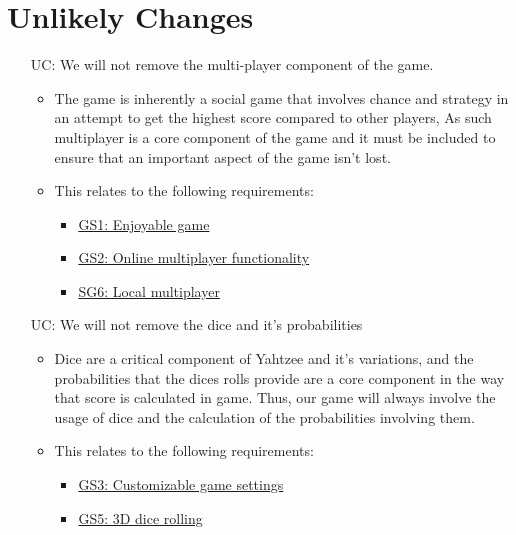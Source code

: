 \begin{itemize}
    


\end{itemize}

\newpage
\section{Unlikely Changes}    

\noindent \begin{itemize}

\item[UC\refstepcounter{ucnum}\theucnum \label{ULC_multiplayer}:] We will not remove the multi-player component of the game.

\begin{itemize}
	\item The game is inherently a social game that involves chance and strategy in an attempt to get the highest score compared to other players, As such multiplayer is a core component of the game and it must be included to ensure that an important aspect of the game isn't lost.
	\item This relates to the following requirements: 
	\begin{itemize}
		\item \hyperref[G_enjoyable]{GS1: Enjoyable game}
		\item \hyperref[G_multiplayer]{GS2: Online multiplayer functionality}
		\item \hyperref[G_local_multiplayer]{SG6: Local multiplayer}
	\end{itemize}
\end{itemize}

	
\item[UC\refstepcounter{ucnum}\theucnum \label{ULC_dice}:] We will not remove the dice and it's probabilities 

\begin{itemize}
	\item Dice are a critical component of Yahtzee and it's variations, and the probabilities that the dices rolls provide are a core component in the way that score is calculated in game. Thus, our game will always involve the usage of dice and the calculation of the probabilities involving them.
	\item This relates to the following requirements: 
	\begin{itemize}
		\item \hyperref[G_customization]{GS3: Customizable game settings}
		\item \hyperref[G_3D]{GS5: 3D dice rolling}
	\end{itemize}
\end{itemize}



\end{itemize}

